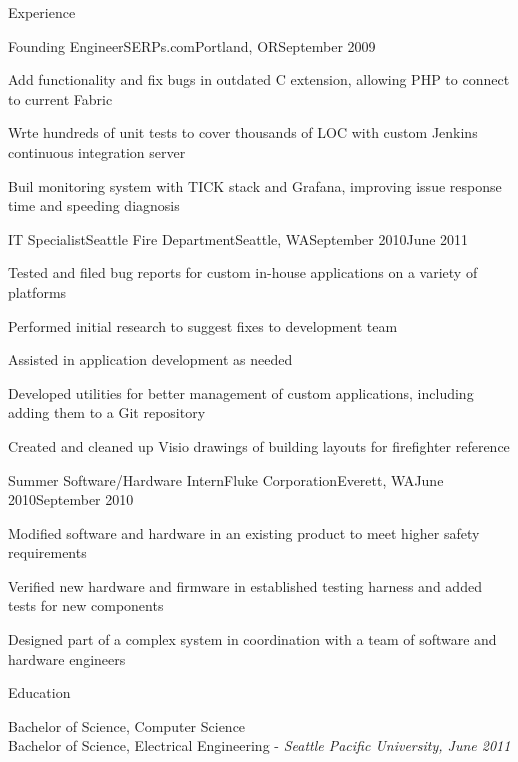 \documentclass[letterpaper,10pt]{article}
\let\pt\pasttense
\begin{document}
\begin{res_section}{Experience}
\begin{res_experienceitem}{Founding Engineer}{SERPs.com}{Portland, OR}{September 2009}{{\pt[Present]{March 2017}}}
  \item Add\pt{ed} functionality and fix\pt{ed} bugs in outdated C extension, allowing PHP to connect to current Fabric
  \item Wr\pt[i]{o}te hundreds of unit tests to cover thousands of LOC with custom Jenkins continuous integration server
  \item Buil\pt[d]{t} monitoring system with TICK stack and Grafana, improving issue response time and speeding diagnosis
\end{res_experienceitem}
\begin{res_experienceitem}{IT Specialist}{Seattle Fire Department}{Seattle, WA}{September 2010}{June 2011}
  \item Tested and filed bug reports for custom in-house applications on a variety of platforms
  \item Performed initial research to suggest fixes to development team
  \item Assisted in application development as needed
  \item Developed utilities for better management of custom applications, including adding them to a Git repository
  \item Created and cleaned up Visio drawings of building layouts for firefighter reference
\end{res_experienceitem}
\begin{res_experienceitem}{Summer Software/Hardware Intern}{Fluke Corporation}{Everett, WA}{June 2010}{September 2010}
  \item Modified software and hardware in an existing product to meet higher safety requirements
  \item Verified new hardware and firmware in established testing harness and added tests for new components
  \item Designed part of a complex system in coordination with a team of software and hardware engineers
\end{res_experienceitem}
\end{res_section}

\begin{res_section}{Education}
\begin{res_content}{Bachelor of Science, Computer Science\\
Bachelor of Science, Electrical Engineering - \em{Seattle Pacific University, June 2011}
}
\end{res_content}
\end{res_section}
\end{document}
